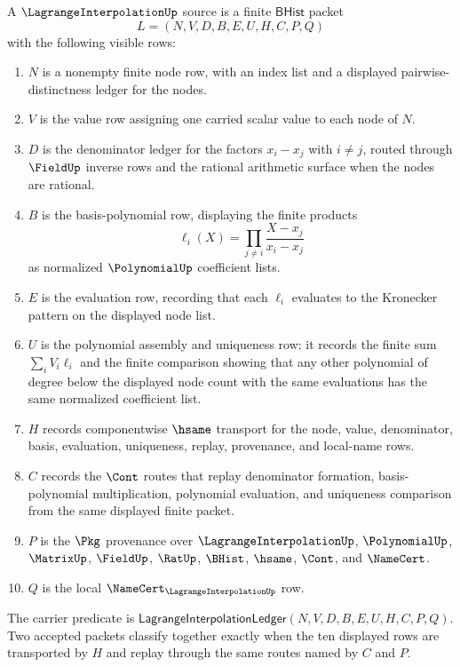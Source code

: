 \begin{definition}
\label{def:lagrange-interpolation-carrier}
A $\LagrangeInterpolationUp$ source is a finite $\mathsf{BHist}$ packet
$$
L=(N,V,D,B,E,U,H,C,P,Q)
$$
with the following visible rows:
\begin{enumerate}
\item $N$ is a nonempty finite node row, with an index list and a displayed
pairwise-distinctness ledger for the nodes.
\item $V$ is the value row assigning one carried scalar value to each node of
$N$.
\item $D$ is the denominator ledger for the factors $x_i-x_j$ with
$i\ne j$, routed through $\FieldUp$ inverse rows and the rational arithmetic
surface when the nodes are rational.
\item $B$ is the basis-polynomial row, displaying the finite products
$$
\ell_i(X)=\prod_{j\ne i}\frac{X-x_j}{x_i-x_j}
$$
as normalized $\PolynomialUp$ coefficient lists.
\item $E$ is the evaluation row, recording that each $\ell_i$ evaluates to the
Kronecker pattern on the displayed node list.
\item $U$ is the polynomial assembly and uniqueness row: it records the finite
sum $\sum_i V_i\ell_i$ and the finite comparison showing that any other
polynomial of degree below the displayed node count with the same evaluations
has the same normalized coefficient list.
\item $H$ records componentwise $\hsame$ transport for the node, value,
denominator, basis, evaluation, uniqueness, replay, provenance, and local-name
rows.
\item $C$ records the $\Cont$ routes that replay denominator formation,
basis-polynomial multiplication, polynomial evaluation, and uniqueness
comparison from the same displayed finite packet.
\item $P$ is the $\Pkg$ provenance over $\LagrangeInterpolationUp$,
$\PolynomialUp$, $\MatrixUp$, $\FieldUp$, $\RatUp$, $\BHist$, $\hsame$,
$\Cont$, and $\NameCert$.
\item $Q$ is the local $\NameCert_{\LagrangeInterpolationUp}$ row.
\end{enumerate}
The carrier predicate is
$\mathsf{LagrangeInterpolationLedger}(N,V,D,B,E,U,H,C,P,Q)$. Two accepted
packets classify together exactly when the ten displayed rows are transported
by $H$ and replay through the same routes named by $C$ and $P$.
\end{definition}

